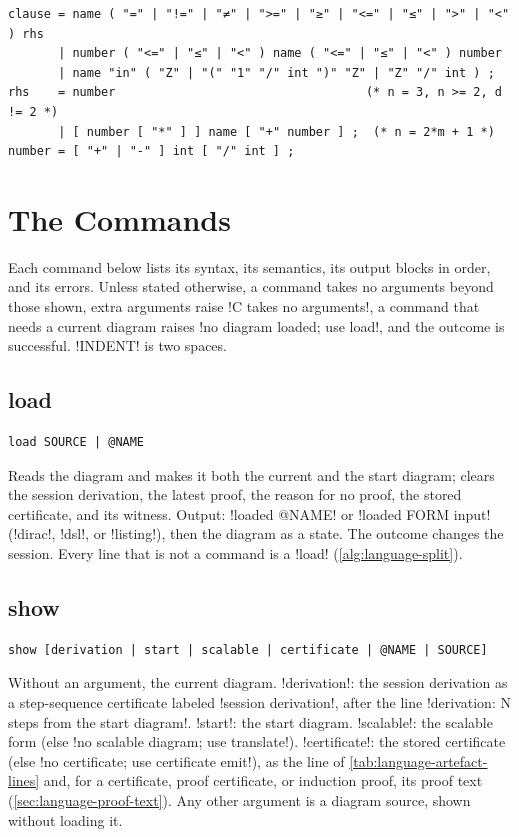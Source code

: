 \begin{lstlisting}[style=grammar,caption={Restriction clauses.},label={lst:language-clauses}]
clause = name ( "=" | "!=" | "≠" | ">=" | "≥" | "<=" | "≤" | ">" | "<" ) rhs
       | number ( "<=" | "≤" | "<" ) name ( "<=" | "≤" | "<" ) number
       | name "in" ( "Z" | "(" "1" "/" int ")" "Z" | "Z" "/" int ) ;
rhs    = number                                   (* n = 3, n >= 2, d != 2 *)
       | [ number [ "*" ] ] name [ "+" number ] ;  (* n = 2*m + 1 *)
number = [ "+" | "-" ] int [ "/" int ] ;
\end{lstlisting}

\section{The Commands}\label{sec:language-commands}

Each command below lists its syntax, its semantics, its output blocks in order, and its errors. Unless stated otherwise, a command takes no arguments beyond those shown, extra arguments raise \code!C takes no arguments!, a command that needs a current diagram raises \code!no diagram loaded; use load!, and the outcome is successful. \code!INDENT! is two spaces.

\subsection{load}\label{sec:language-load}

\begin{lstlisting}[style=azx]
load SOURCE | @NAME
\end{lstlisting}
Reads the diagram and makes it both the current and the start diagram; clears the session derivation, the latest proof, the reason for no proof, the stored certificate, and its witness. Output: \code!loaded @NAME! or \code!loaded FORM input! (\code!dirac!, \code!dsl!, or \code!listing!), then the diagram as a state. The outcome changes the session. Every line that is not a command is a \azx!load! (\cref{alg:language-split}).

\subsection{show}

\begin{lstlisting}[style=azx]
show [derivation | start | scalable | certificate | @NAME | SOURCE]
\end{lstlisting}
Without an argument, the current diagram. \code!derivation!: the session derivation as a step-sequence certificate labeled \code!session derivation!, after the line \code!derivation: N steps from the start diagram!. \code!start!: the start diagram. \code!scalable!: the scalable form (else \code!no scalable diagram; use translate!). \code!certificate!: the stored certificate (else \code!no certificate; use certificate emit!), as the line of \cref{tab:language-artefact-lines} and, for a certificate, proof certificate, or induction proof, its proof text (\cref{sec:language-proof-text}). Any other argument is a diagram source, shown without loading it.

